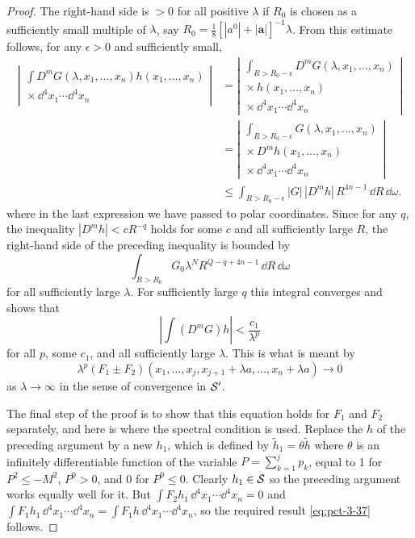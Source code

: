 \begin{proof}
The right-hand side is $>0$ for all positive $\lambda$ if $R_0$ is chosen as
a sufficiently small multiple of $\lambda$, say
$R_0=\frac18[|a^0|+|\mathbf{a}|]^{-1}\lambda$. From this estimate follows,
for any $\epsilon>0$ and sufficiently small,
\begin{align*}
 \left|\begin{gathered}
  \int D^mG(\lambda,x_1,\ldots,x_n)h(x_1,\ldots,x_n)\\[-2pt]
  {}\times\dd^4x_1\cdots\dd^4x_n
 \end{gathered}\right|
 &=\left|\begin{gathered}
  \int_{R>R_0-\epsilon}D^mG(\lambda,x_1,\ldots,x_n)\\[-2pt]
  {}\times h(x_1,\ldots,x_n)\\[-2pt]
  {}\times\dd^4x_1\cdots\dd^4x_n
 \end{gathered}\right|\\
 &=\left|\begin{gathered}
  \int_{R>R_0-\epsilon}G(\lambda,x_1,\ldots,x_n)\\[-2pt]
  {}\times D^mh(x_1,\ldots,x_n)\\[-2pt]
  {}\times\dd^4x_1\cdots\dd^4x_n
 \end{gathered}\right|\\
 &\leq\int_{R>R_0-\epsilon}|G|\,|D^mh|\,R^{4n-1}\,\dd R\,\dd\omega.
\end{align*}
where in the last expression we have passed to polar coordinates. Since for
any $q$, the inequality $|D^mh|<cR^{-q}$ holds for some $c$ and all
sufficiently large $R$, the right-hand side of the preceding inequality is
bounded by
\begin{equation*}
 \int_{R>R_0}G_0\lambda^N R^{Q-q+4n-1}\,\dd R\,\dd\omega
\end{equation*}
for all sufficiently large $\lambda$. For sufficiently large $q$ this
integral converges and shows that
\begin{equation*}
 \left|\int(D^mG)h\right|<\frac{c_1}{\lambda^p}
\end{equation*}
for all $p$, some $c_1$, and all sufficiently large $\lambda$. This is what
is meant by
\begin{equation*}
 \lambda^p(F_1\pm F_2)(x_1,\ldots,x_j,x_{j+1}+\lambda a,\ldots,
 x_n+\lambda a)\longrightarrow0
\end{equation*}
as $\lambda\to\infty$ in the sense of convergence in $\mathcal{S}'$.

The final step of the proof is to show that this equation holds for $F_1$ and
$F_2$ separately, and here is where the spectral condition is used. Replace
the $h$ of the preceding argument by a new $h_1$, which is defined by
$\widetilde h_1=\theta\widetilde h$ where $\theta$ is an infinitely
differentiable function of the variable $P=\sum_{k=1}^{j}p_k$, equal to 1
 for $P^2\leq -M^2$, $P^0>0$, and 0 for $P^0\leq0$. Clearly
$h_1\in\mathcal{S}$ so the preceding argument works equally well for it. But
$\int F_2h_1\,\dd^4x_1\cdots\dd^4x_n=0$ and
$\int F_1h_1\,\dd^4x_1\cdots\dd^4x_n=\int F_1h\,\dd^4x_1\cdots\dd^4x_n$,
so the required result \eqref{eq:pct-3-37} follows.
\end{proof}


